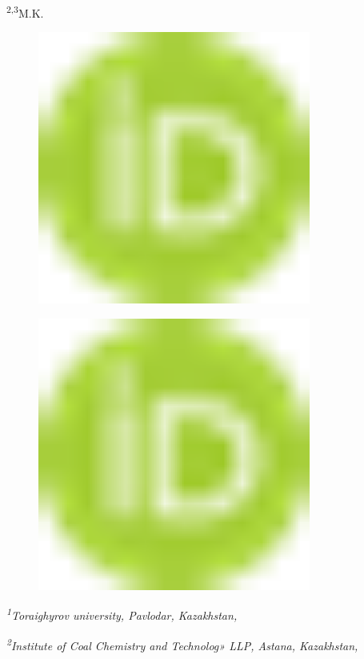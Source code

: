 \textsuperscript{2,3}M.K.
\begin{figure}[H]
	\centering
	\includegraphics[width=0.8\textwidth]{media/gorn2/image1}
	\caption*{}
\end{figure}


\begin{figure}[H]
	\centering
	\includegraphics[width=0.8\textwidth]{media/gorn2/image1}
	\caption*{}
\end{figure}


\emph{\textsuperscript{1}Toraighyrov university, Pavlodar, Kazakhstan,}

\emph{\textsuperscript{2}Institute of Coal Chemistry and Technolog» LLP,
Astana, Kazakhstan,}

